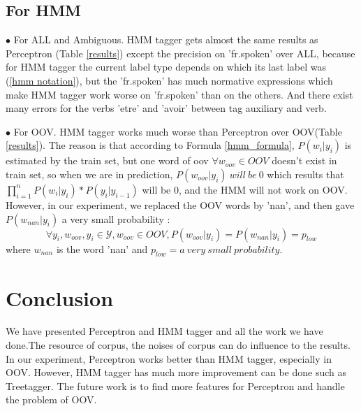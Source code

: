 \documentclass{article}
\def\YY{{\mathcal{Y}}}
\begin{document}
\subsection{For HMM}  

$\bullet$ For ALL and Ambiguous. HMM tagger gets almost the same results as Perceptron (Table \ref{results}) except the precision on 'fr.spoken' over ALL, because for HMM tagger the current label type depends on which its last label was (\ref{hmm notation}), but the 'fr.spoken' has much normative expressions which make HMM tagger work worse on 'fr.spoken' than on the others. And there exist many errors for the verbs 'etre' and 'avoir' between tag auxiliary and verb.

$\bullet$ For OOV. HMM tagger works much worse than Perceptron over OOV(Table \ref{results}). The reason is that according to Formula \ref{hmm_formula}, $P(w_i|y_i)$ is estimated by the train set, but one word of oov $\forall w_{oov} \in OOV$ doesn't exist in train set, so when we are in prediction, $P(w_{oov}|y_i)\ will\ be\ 0$ which results that $\prod_{i=1}^n P(w_i|y_i)*P(y_i|y_{i-1})$ will be 0, and the HMM will not work on OOV. However, in our experiment, we replaced the OOV words by 'nan', and then gave $ P(w_{nan}|y_i)$ a very small probability : $$\forall{y_i, w_{oov}}, y_i \in \YY, w_{oov}  \in OOV, P(w_{oov}|y_i) = P(w_{nan}|y_i) = p_{low}$$ where $w_{nan}$ is the word 'nan' and $p_{low} = a\ very\ small\ probability$. 

\section{Conclusion}
We have presented Perceptron and HMM tagger and all the work we have done.The resource of corpus, the noises of corpus can do influence to the results. In our experiment, Perceptron works better than HMM tagger, especially in OOV. However, HMM tagger has much more improvement can be done such as Treetagger\cite{schmid1994probabilistic}. The future work is to find more features for Perceptron and handle the problem of OOV. 

 
% 

\end{document}
